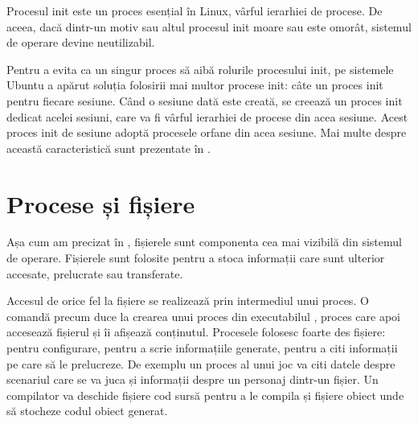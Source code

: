
Procesul init este un proces esențial în Linux, vârful ierarhiei de procese. De
aceea, dacă dintr-un motiv sau altul procesul init moare sau este omorât,
sistemul de operare devine neutilizabil.

Pentru a evita ca un singur proces să aibă rolurile procesului init, pe
sistemele Ubuntu a apărut soluția folosirii mai multor procese init: câte un
proces init pentru fiecare sesiune. Când o sesiune dată este creată, se creează
un proces init dedicat acelei sesiuni, care va fi vârful ierarhiei de procese
din acea sesiune. Acest proces init de sesiune adoptă procesele orfane din acea
sesiune. Mai multe despre această caracteristică sunt prezentate în .

\section{Procese și fișiere}
\label{sec:process-fisiere}

Așa cum am precizat în ,
fișierele sunt componenta cea mai vizibilă din sistemul de operare. Fișierele
sunt folosite pentru a stoca informații care sunt ulterior accesate, prelucrate
sau transferate.

Accesul de orice fel la fișiere se realizează prin intermediul unui proces. O
comandă precum  duce la crearea unui proces din executabilul ,
proces care apoi accesează fișierul  și îi afișează conținutul. Procesele
folosesc foarte des fișiere: pentru configurare, pentru a scrie informațiile
generate, pentru a citi informații pe care să le prelucreze. De exemplu un
proces al unui joc va citi datele despre scenariul care se va juca și informații
despre un personaj dintr-un fișier. Un compilator va deschide fișiere cod sursă
pentru a le compila și fișiere obiect unde să stocheze codul obiect generat.

